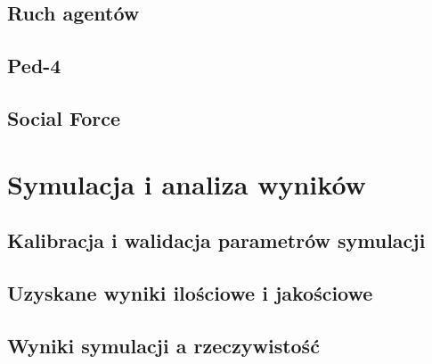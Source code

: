 \documentclass[a4paper, 12pt]{article}
\begin{document}
        \subsection{Ruch agentów}
        \label{sec:movement-impl}

        \subsection{Ped-4}
        \label{sec:ped-4-impl}

        \subsection{Social Force}
        \label{sec:social-force-impl}

\newpage
    \section{Symulacja i analiza wyników}
    \label{sec:sim}


        \subsection{Kalibracja i walidacja parametrów symulacji}
        \label{sec:p}


        \subsection{Uzyskane wyniki ilościowe i jakościowe}
        \label{sec:results}


        \subsection{Wyniki symulacji a rzeczywistość}
        \label{sec:sim-vs-reality}

\end{document}
